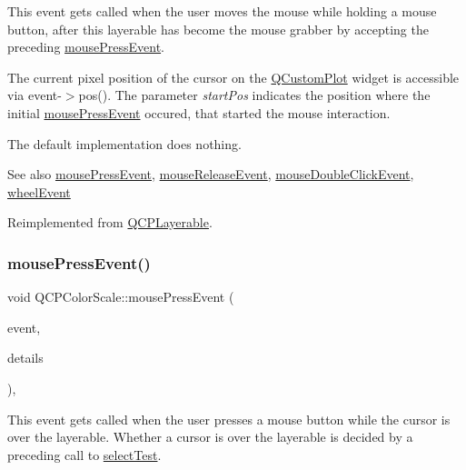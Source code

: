 This event gets called when the user moves the mouse while holding a mouse button, after this layerable has become the mouse grabber by accepting the preceding \hyperlink{class_q_c_p_color_scale_a91f633b97ffcd57fdf8cd814974c20e6}{mouse\+Press\+Event}.

The current pixel position of the cursor on the \hyperlink{class_q_custom_plot}{Q\+Custom\+Plot} widget is accessible via {\ttfamily event-\/$>$pos()}. The parameter {\itshape start\+Pos} indicates the position where the initial \hyperlink{class_q_c_p_color_scale_a91f633b97ffcd57fdf8cd814974c20e6}{mouse\+Press\+Event} occured, that started the mouse interaction.

The default implementation does nothing.

\begin{DoxySeeAlso}{See also}
\hyperlink{class_q_c_p_color_scale_a91f633b97ffcd57fdf8cd814974c20e6}{mouse\+Press\+Event}, \hyperlink{class_q_c_p_color_scale_a6a35dd39ab4e5cb2d7b29ebb4d5b61b0}{mouse\+Release\+Event}, \hyperlink{class_q_c_p_layerable_a4171e2e823aca242dd0279f00ed2de81}{mouse\+Double\+Click\+Event}, \hyperlink{class_q_c_p_color_scale_a63cf19be184f6670c9495ad3a9a1baeb}{wheel\+Event} 
\end{DoxySeeAlso}


Reimplemented from \hyperlink{class_q_c_p_layerable_a9eee1ba47fd69be111059ca3881933e4}{Q\+C\+P\+Layerable}.

\mbox{\label{class_q_c_p_color_scale_a91f633b97ffcd57fdf8cd814974c20e6}} 
\subsubsection{\texorpdfstring{mouse\+Press\+Event()}{mousePressEvent()}}
{\footnotesize\ttfamily void Q\+C\+P\+Color\+Scale\+::mouse\+Press\+Event (\begin{DoxyParamCaption}\item[{Q\+Mouse\+Event $\ast$}]{event,  }\item[{const Q\+Variant \&}]{details }\end{DoxyParamCaption})\hspace{0.3cm}{\ttfamily [protected]}, {\ttfamily [virtual]}}

This event gets called when the user presses a mouse button while the cursor is over the layerable. Whether a cursor is over the layerable is decided by a preceding call to \hyperlink{class_q_c_p_layout_element_ae97f483cccedadbf18ea4525ef240ee4}{select\+Test}.

